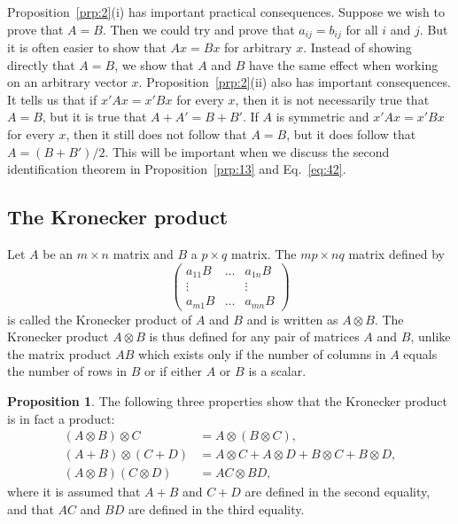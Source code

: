 \documentclass[12pt,a4paper]{article}
\theoremstyle{definition}
\newtheorem{proposition}{Proposition}
\begin{document}
Proposition~\ref{prp:2}(i) has important practical consequences. Suppose we wish to prove that $A = B$. Then we could try and prove that $a_{ij} = b_{ij}$ for all $i$ and $j$. But it is often easier to show that $Ax = Bx$ for arbitrary $x$. %
Instead of showing directly that $A = B$, we show that $A$ and $B$ have the same effect when working on an arbitrary vector $x$. %
Proposition~\ref{prp:2}(ii) also has important consequences. It tells us that if $x'Ax = x'Bx$ for every $x$, then it is not necessarily true that $A = B$, but it is true that $A + A' = B + B'$. If $A$ is symmetric and $x'Ax = x'Bx$ for every $x$, then it still does not follow that $A = B$, but it does follow that $A = (B + B')/2$. %
This will be important when we discuss the second identification theorem in Proposition~\ref{prp:13} and Eq.~\eqref{eq:42}. %

\subsection{The Kronecker product}\label{sec:2.3}

Let $A$ be an $m \times n$ matrix and $B$ a $p \times q$ matrix. The $mp \times nq$ matrix defined by
\begin{equation}\label{eq:2}
\begin{pmatrix}
a_{11}B & \dots & a_{1n}B \\
\vdots & & \vdots \\
a_{m1}B & \dots & a_{mn}B
\end{pmatrix}
\end{equation}
is called the Kronecker product of $A$ and $B$ and is written as $A \otimes B$. %
The Kronecker product $A \otimes B$ is thus defined for any pair of matrices $A$ and $B$, unlike the matrix product $AB$ which exists only if the number of columns in $A$ equals the number of rows in $B$ or if either $A$ or $B$ is a scalar. %

\begin{proposition}\label{prp:3}
The following three properties show that the Kronecker product is in fact a product:
\begin{align*}
(A \otimes B) \otimes C &= A \otimes (B \otimes C), \\
(A + B) \otimes (C + D) &= A \otimes C + A \otimes D + B \otimes C + B \otimes D, \\
(A \otimes B)(C \otimes D) &= AC \otimes BD,
\end{align*}
where it is assumed that $A + B$ and $C + D$ are defined in the second equality, and that $AC$ and $BD$ are defined in the third equality. %
\end{proposition}
\end{document}
